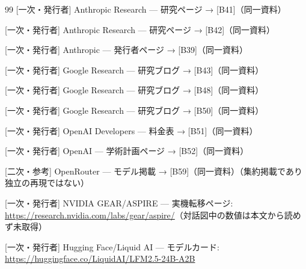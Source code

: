 \documentclass[lualatex,a4paper,10pt]{jlreq}
\begin{document}
\begin{thebibliography}{99}
 [一次・発行者] Anthropic Research — 研究ページ → [B41]（同一資料）

 [一次・発行者] Anthropic Research — 研究ページ → [B42]（同一資料）

 [一次・発行者] Anthropic — 発行者ページ → [B39]（同一資料）

 [一次・発行者] Google Research — 研究ブログ → [B43]（同一資料）

 [一次・発行者] Google Research — 研究ブログ → [B48]（同一資料）

 [一次・発行者] Google Research — 研究ブログ → [B50]（同一資料）

 [一次・発行者] OpenAI Developers — 料金表 → [B51]（同一資料）

 [一次・発行者] OpenAI — 学術計画ページ → [B52]（同一資料）

 [二次・参考] OpenRouter — モデル掲載 → [B59]（同一資料）（集約掲載であり独立の再現ではない）

 [一次・発行者] NVIDIA GEAR/ASPIRE — 実機転移ページ: \url{https://research.nvidia.com/labs/gear/aspire/}（対話図中の数値は本文から読めず未取得）

 [一次・発行者] Hugging Face/Liquid AI — モデルカード: \url{https://huggingface.co/LiquidAI/LFM2.5-24B-A2B}

\end{thebibliography}
\end{document}
